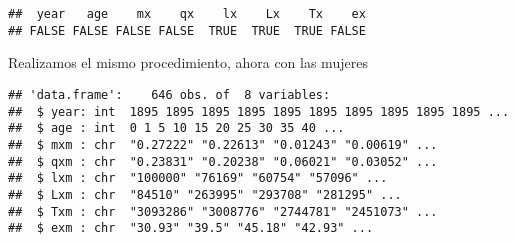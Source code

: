 \documentclass[
]{article}
\newenvironment{Shaded}{\begin{snugshade}}{\end{snugshade}}
\newcommand{\CommentTok}[1]{\textcolor[rgb]{0.56,0.35,0.01}{\textit{#1}}}
\newcommand{\FunctionTok}[1]{\textcolor[rgb]{0.00,0.00,0.00}{#1}}
\newcommand{\NormalTok}[1]{#1}
\newcommand{\OtherTok}[1]{\textcolor[rgb]{0.56,0.35,0.01}{#1}}
\newcommand{\SpecialCharTok}[1]{\textcolor[rgb]{0.00,0.00,0.00}{#1}}
\newcommand{\StringTok}[1]{\textcolor[rgb]{0.31,0.60,0.02}{#1}}
\begin{document}
\begin{verbatim}
##  year   age    mx    qx    lx    Lx    Tx    ex 
## FALSE FALSE FALSE FALSE  TRUE  TRUE  TRUE FALSE
\end{verbatim}

Realizamos el mismo procedimiento, ahora con las mujeres

\begin{Shaded}
\end{Shaded}

\begin{verbatim}
## 'data.frame':    646 obs. of  8 variables:
##  $ year: int  1895 1895 1895 1895 1895 1895 1895 1895 1895 1895 ...
##  $ age : int  0 1 5 10 15 20 25 30 35 40 ...
##  $ mxm : chr  "0.27222" "0.22613" "0.01243" "0.00619" ...
##  $ qxm : chr  "0.23831" "0.20238" "0.06021" "0.03052" ...
##  $ lxm : chr  "100000" "76169" "60754" "57096" ...
##  $ Lxm : chr  "84510" "263995" "293708" "281295" ...
##  $ Txm : chr  "3093286" "3008776" "2744781" "2451073" ...
##  $ exm : chr  "30.93" "39.5" "45.18" "42.93" ...
\end{verbatim}
\end{document}
